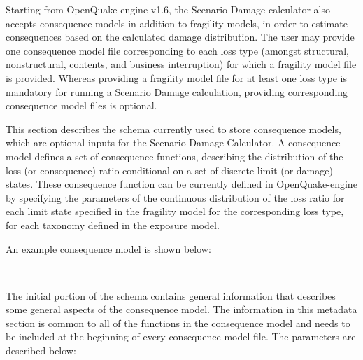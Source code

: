 Starting from OpenQuake-engine v1.6, the Scenario Damage calculator also
accepts consequence models in addition to fragility models, in order to
estimate consequences based on the calculated damage distribution. The user
may provide one consequence model file corresponding to each loss type
(amongst structural, nonstructural, contents, and business interruption) for
which a fragility model file is provided. Whereas providing a fragility model
file for at least one loss type is mandatory for running a Scenario Damage
calculation, providing corresponding consequence model files is optional.

This section describes the schema currently used to store \glspl{consequence
model}, which are optional inputs for the Scenario Damage Calculator. A
\gls{consequence model} defines a set of \glspl{consequence function},
describing the distribution of the loss (or consequence) ratio conditional on
a set of discrete limit (or damage) states. These \gls{consequence function}
can be currently defined in OpenQuake-engine by specifying the parameters of
the continuous distribution of the loss ratio for each limit state specified
in the fragility model for the corresponding loss type, for each taxonomy
defined in the exposure model.

An example consequence model is shown below:

\inputminted[firstline=1,firstnumber=1,fontsize=\footnotesize,frame=single,linenos,bgcolor=lightgray]{xml}{oqum/risk/Verbatim/input_consequence.xml}\\	

The initial portion of the schema contains general information that describes
some general aspects of the consequence model. The information in this metadata
section is common to all of the functions in the consequence model and needs to
be included at the beginning of every consequence model file. The parameters are
described below:

